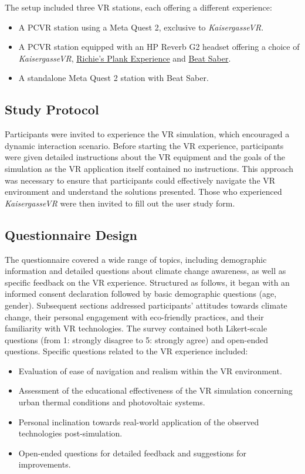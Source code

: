 \documentclass[draft, final]{vutinfth} %
\begin{document}
The setup included three VR stations, each offering a different experience:
\begin{itemize}
    \item A PCVR station using a Meta Quest 2, exclusive to \textit{KaisergasseVR}.
    \item A PCVR station equipped with an HP Reverb G2 headset offering a choice of \textit{KaisergasseVR}, \hyperlink{https://store.steampowered.com/app/517160/Richies_Plank_Experience/}{Richie's Plank Experience} and \hyperlink{https://store.steampowered.com/app/620980/Beat_Saber/}{Beat Saber}.
   \item A standalone Meta Quest 2 station with Beat Saber.
\end{itemize}

\subsection{Study Protocol}
 Participants were invited to experience the VR simulation, which encouraged a dynamic interaction scenario. Before starting the VR experience, participants were given detailed instructions about the VR equipment and the goals of the simulation as the VR application itself contained no instructions. This approach was necessary to ensure that participants could effectively navigate the VR environment and understand the solutions presented. Those who experienced \textit{KaisergasseVR} were then invited to fill out the user study form.

\subsection{Questionnaire Design}
The questionnaire covered a wide range of topics, including demographic information and detailed questions about climate change awareness, as well as specific feedback on the VR experience. Structured as follows, it began with an informed consent declaration followed by basic demographic questions (age, gender). Subsequent sections addressed participants' attitudes towards climate change, their personal engagement with eco-friendly practices, and their familiarity with VR technologies. The survey contained both Likert-scale questions (from 1: strongly disagree to 5: strongly agree) and open-ended questions. Specific questions related to the VR experience included:
\begin{itemize}
    \item Evaluation of ease of navigation and realism within the VR environment.
    \item Assessment of the educational effectiveness of the VR simulation concerning urban thermal conditions and photovoltaic systems.
    \item Personal inclination towards real-world application of the observed technologies post-simulation.
    \item Open-ended questions for detailed feedback and suggestions for improvements.
\end{itemize}
\end{document}
